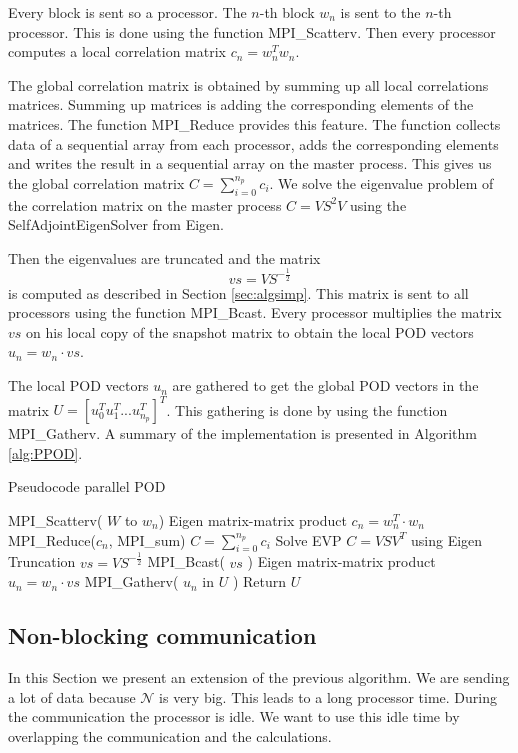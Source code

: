 Every block is sent so a processor.
The $n$-th block $w_n$ is sent to the $n$-th processor.
This is done using the function MPI\_Scatterv.
Then every processor computes a local correlation matrix $c_n = w_n^T w_n$.

The global correlation matrix is obtained by summing up all local correlations matrices.
Summing up matrices is adding the corresponding elements of the matrices.
The function MPI\_Reduce provides this feature.
The function collects data of a sequential array from each processor,  adds the corresponding elements and writes the result in a sequential array on the master process.
This gives us the global correlation matrix $C = \sum_{i=0}^{n_p} c_i$.
We solve the eigenvalue problem of the correlation matrix on the master process $C = VS^2V$ using the SelfAdjointEigenSolver from Eigen.

Then the eigenvalues are truncated and the matrix
$$vs = VS^{-\frac{1}{2}}$$
is computed as described in Section \ref{sec:algsimp}.
This matrix is sent to all processors using the function  MPI\_Bcast.
Every processor multiplies the matrix $vs$ on his local copy of the snapshot matrix to obtain the local POD vectors
$u_n = w_n \cdot vs$.

The local POD vectors $u_n$ are gathered to get the global POD vectors in the matrix $U = [u_0^T u_1^T ... u_{n_p}^T]^T$.
This gathering is done by using the function MPI\_Gatherv.
A summary of the implementation is presented in Algorithm \ref{alg:PPOD}.

\begin{algorithm}[H]
	\caption{Pseudocode parallel POD}
	\begin{algorithmic}[1]
			\State MPI\_Scatterv( $W$ to $w_n$)
			\State Eigen matrix-matrix product $c_n = w_n^T\cdot w_n$ 
			\State MPI\_Reduce($c_n$, MPI\_sum) $C = \sum_{i=0}^{n_p} c_i$ 
				\State Solve EVP $C = VSV^T$ using Eigen
				\State Truncation
				\State $vs = VS^{-\frac{1}{2}}$
			\EndIf
			\State MPI\_Bcast( $vs$ )
			\State Eigen matrix-matrix product $u_n = w_n\cdot vs$
			\State MPI\_Gatherv( $u_n$ in $U$ )
			\State Return $U$
		\EndFunction
	\end{algorithmic}
	\label{alg:PPOD}
\end{algorithm}

\newpage
\subsection{Non-blocking communication}
\label{sec:nonBlockComm}
In this Section we present an extension of the previous algorithm.
We are sending a lot of data because $\mathcal{ N }$ is very big. This leads to a long processor time.
During the communication the processor is idle.
We want to use this idle time by overlapping the communication and the calculations.

